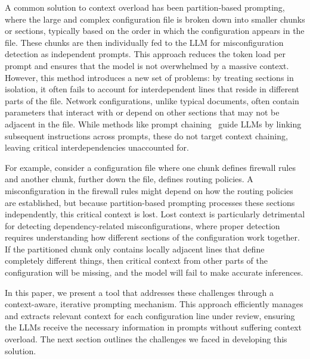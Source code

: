  A common solution to context overload has been partition-based prompting,
where the large and complex configuration file is broken down into smaller
chunks or sections, typically based on the order in which the configuration
appears in the file. These chunks are then individually fed to the LLM for
misconfiguration detection as independent prompts. This approach reduces the
token load per prompt and ensures that the model is not overwhelmed by a
massive context. However, this method introduces a new set of problems: by
treating sections in isolation, it often fails to account for interdependent
lines that reside in different parts of the file. Network configurations,
unlike typical documents, often contain parameters that interact with or
depend on other sections that may not be adjacent in the file. While methods
like prompt chaining~\cite{wang2024identifying,bogdanov2024leveraging} guide
LLMs by linking subsequent instructions across prompts, these do not target
context chaining, leaving critical interdependencies unaccounted for.

For example, consider a configuration file where one chunk defines firewall
rules and another chunk, further down the file, defines routing policies. A
misconfiguration in the firewall rules might depend on how the routing
policies are established, but because partition-based prompting processes
these sections independently, this critical context is lost. Lost context
is particularly detrimental for detecting dependency-related
misconfigurations, where proper detection requires understanding how different
sections of the configuration work together. If the partitioned chunk only
contains locally adjacent lines that define completely different things, then
critical context from other parts of the configuration will be missing, and
the model will fail to make accurate inferences.


In this paper, we present a tool that addresses these challenges through a
context-aware, iterative prompting mechanism. This approach efficiently
manages and extracts relevant context for each configuration line under
review, ensuring the LLMs receive the necessary information in prompts without
suffering context overload. The next section outlines the challenges we faced
in developing this solution.
